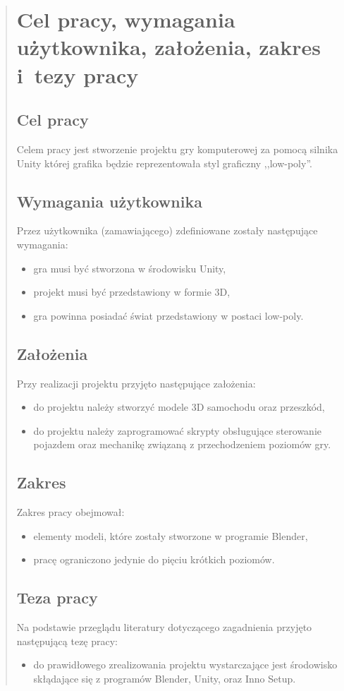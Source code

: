 \begin{quotation}
\chapter{Cel pracy, wymagania użytkownika, założenia, zakres i~tezy pracy}

\section{Cel pracy}\label{cel}

Celem pracy jest stworzenie projektu gry komputerowej za pomocą silnika Unity której grafika będzie reprezentowała styl graficzny ,,low-poly''.

\section{Wymagania użytkownika}

Przez użytkownika (zamawiającego) zdefiniowane zostały następujące wymagania:
\begin{itemize}
\item gra musi być stworzona w środowisku Unity,
\item projekt musi być przedstawiony w formie 3D,
\item gra powinna posiadać świat przedstawiony w postaci low-poly.
\end{itemize}

\section{Założenia}

Przy realizacji projektu przyjęto następujące założenia:
\begin{itemize}
\item do projektu należy stworzyć modele 3D samochodu oraz przeszkód,
\item do projektu należy zaprogramować skrypty obsługujące sterowanie pojazdem oraz mechanikę związaną z przechodzeniem poziomów gry.
\end{itemize}

\section{Zakres}

Zakres pracy obejmował:
\begin{itemize}
\item elementy modeli, które zostały stworzone w programie Blender,
\item pracę ograniczono jedynie do pięciu krótkich poziomów.
\end{itemize}

\section{Teza pracy}

Na podstawie przeglądu literatury dotyczącego zagadnienia przyjęto następującą tezę pracy:
\begin{itemize}
\item do prawidłowego zrealizowania projektu wystarczające jest środowisko skłądające się z programów Blender, Unity, oraz Inno Setup.
\end{itemize}

\end{quotation}
